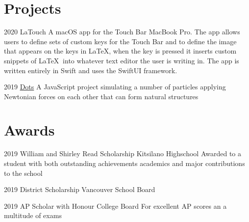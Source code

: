 \documentclass[]{style}
\begin{document}
\section{Projects}

\begin{entrylist}


\entry
{2020}
{LaTouch}
{}
{A macOS app for the Touch Bar MacBook Pro. The app allows users to define sets of custom keys for the Touch Bar and to define the image that appears on the keys in \LaTeX, when the key is pressed it inserts custom snippets of \LaTeX $\:$ into whatever text editor the user is writing in. The app is written entirely in Swift and uses the SwiftUI framework.}


\entry
{2019}
{\href{https://sachagoldman.com/dots/}{Dots}}
{}
{A JavaScript project simulating a number of particles applying Newtonian forces on each other that can form natural structures}


\end{entrylist}



\section{Awards}

\begin{entrylist}


\entry
{2019}
{William and Shirley Read Scholarship}
{Kitsilano Highschool}
{Awarded to a student with both outstanding achievements academics and major contributions to the school}


\entry
{2019}
{District Scholarship}
{Vancouver School Board}
{}

\entry
{2019}
{AP Scholar with Honour}
{College Board}
{For excellent AP scores an a multitude of exams}


\end{entrylist}
\end{document}
